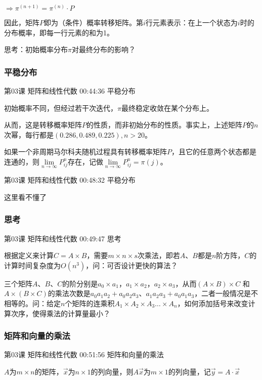 \documentclass[UTF8]{ctexbook}
\begin{document}
$\Rightarrow \pi^{(n+1)}=\pi^{(n)} \cdot P$

因此，矩阵$P$即为（条件）概率转移矩阵。第$i$行元素表示：在上一个状态为$i$时的分布概率，即每一行元素的和为1。

思考：初始概率分布$\pi$对最终分布的影响？\\

\subsubsection{平稳分布}

第03课 矩阵和线性代数 00:44:36 平稳分布

初始概率不同，但经过若干次迭代，$\pi$最终稳定收敛在某个分布上。

从而，这是转移概率矩阵$P$的性质，而非初始分布的性质。事实上，上述矩阵$P$的$n$次幂，每行都是$(0.286,0.489,0.225), n > 20$。

如果一个非周期马尔科夫随机过程具有转移概率矩阵$P$，且它的任意两个状态都是连通的，则$\underset{n \rightarrow \infty }{\lim}P_{ij}^{n}$存在，记做$\underset{n \rightarrow \infty }{\lim}P_{ij}^{n}=\pi(j)$。

第03课 矩阵和线性代数 00:48:32 平稳分布

这里看不懂了

\subsubsection{思考}

第03课 矩阵和线性代数 00:49:47 思考

根据定义来计算$C=A \times B$，需要$m \times n \times s$次乘法，即若$A$、$B$都是$n$阶方阵，$C$的计算时间复杂度为$O(n^{3})$，问：可否设计更快的算法？

三个矩阵$A$、$B$、$C$的阶分别是$a_{0} \times a_{1}$，$a_{1} \times a_{2}$，$a_{2} \times a_{3}$，从而$(A \times B) \times C$ 和 $A \times (B \times C)$的乘法次数是$a_{0}a_{1}a_{2}+a_{0}a_{2}a_{3}$、$a_{1}a_{2}a_{3}+a_{0}a_{1}a_{3}$，二者一般情况是不相等的。问：给定$n$个矩阵的连乘积$A_{1} \times A_{2} \times A_{3} \dots \times A_{n}$，如何添加括号来改变计算次序，使得乘法的计算量最小？


\subsubsection{矩阵和向量的乘法}

第03课 矩阵和线性代数 00:51:56 矩阵和向量的乘法

$A$为$m \times n$的矩阵，$\vec{x}$为$n \times 1$的列向量，则$A\vec{x}$为$m \times 1$的列向量，记$\vec{y}=A \cdot \vec{x}$
\end{document}
